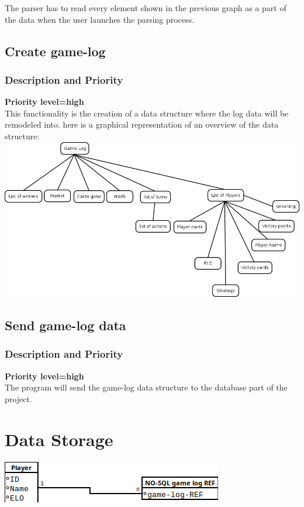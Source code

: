\documentclass{scrreprt}
\begin{document}
The parser has to read every element shown in the previous graph as a part of the data when the user launches the parsing process.\\


\subsection{Create game-log}
\subsubsection{Description and Priority}
\textbf{Priority level=high}\\
This functionality is the creation of a data structure where the log data will
be remodeled into.
here is a graphical representation of an overview of the data structure:\\
\includegraphics[scale=0.5,keepaspectratio]{game-log}

\subsection{Send game-log data}
\subsubsection{Description and Priority}
\textbf{Priority level=high}\\
The program will send the game-log data structure to the database part of the project.
\section{Data Storage}

\includegraphics[keepaspectratio]{SQL}
\end{document}

